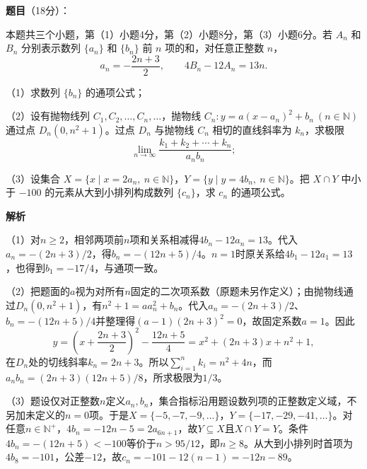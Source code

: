 \begin{answer}

\textbf{题目}（18分）：

本题共三个小题，第（1）小题4分，第（2）小题8分，第（3）小题6分。若 $A_n$ 和 $B_n$ 分别表示数列 $\{a_n\}$ 和 $\{b_n\}$ 前 $n$ 项的和，对任意正整数 $n$，
\nopagebreak[4]
\[
a_n=-\frac{2n+3}{2},\qquad 4B_n-12A_n=13n.
\]

（1）求数列 $\{b_n\}$ 的通项公式；

（2）设有抛物线列 $C_1,C_2,\ldots,C_n,\ldots$，抛物线 $C_n:y=a(x-a_n)^2+b_n\ (n\in\mathbb N)$ 通过点 $D_n(0,n^2+1)$。过点 $D_n$ 与抛物线 $C_n$ 相切的直线斜率为 $k_n$，求极限
\nopagebreak[4]
\[
\lim_{n\to\infty}\frac{k_1+k_2+\cdots+k_n}{a_nb_n};
\]

（3）设集合 $X=\{x\mid x=2a_n,\ n\in\mathbb N\}$，$Y=\{y\mid y=4b_n,\ n\in\mathbb N\}$。把 $X\cap Y$ 中小于 $-100$ 的元素从大到小排列构成数列 $\{c_n\}$，求 $c_n$ 的通项公式。

\textbf{解析}

（1）对$n\ge2$，相邻两项前$n$项和关系相减得$4b_n-12a_n=13$。代入$a_n=-(2n+3)/2$，得$b_n=-(12n+5)/4$。$n=1$时原关系给$4b_1-12a_1=13$，也得到$b_1=-17/4$，与通项一致。

（2）把题面的$a$视为对所有$n$固定的二次项系数（原题未另作定义）；由抛物线通过$D_n(0,n^2+1)$，有$n^2+1=a a_n^2+b_n$。代入$a_n=-(2n+3)/2$、$b_n=-(12n+5)/4$并整理得$(a-1)(2n+3)^2=0$，故固定系数$a=1$。因此
\nopagebreak[4]
\[
y=\left(x+\frac{2n+3}{2}\right)^2-\frac{12n+5}{4}
=x^2+(2n+3)x+n^2+1,
\]
在$D_n$处的切线斜率$k_n=2n+3$。所以$\sum_{i=1}^{n}k_i=n^2+4n$，而$a_nb_n=(2n+3)(12n+5)/8$，所求极限为$1/3$。

（3）题设仅对正整数$n$定义$a_n,b_n$，集合指标沿用题设数列项的正整数定义域，不另加未定义的$n=0$项。于是$X=\{-5,-7,-9,\ldots\}$，$Y=\{-17,-29,-41,\ldots\}$。对任意$n\in\mathbb N^+$，$4b_n=-12n-5=2a_{6n+1}$，故$Y\subseteq X$且$X\cap Y=Y$。条件$4b_n=-(12n+5)<-100$等价于$n>95/12$，即$n\ge8$。从大到小排列时首项为$4b_8=-101$，公差$-12$，故$c_n=-101-12(n-1)=-12n-89$。


\end{answer}